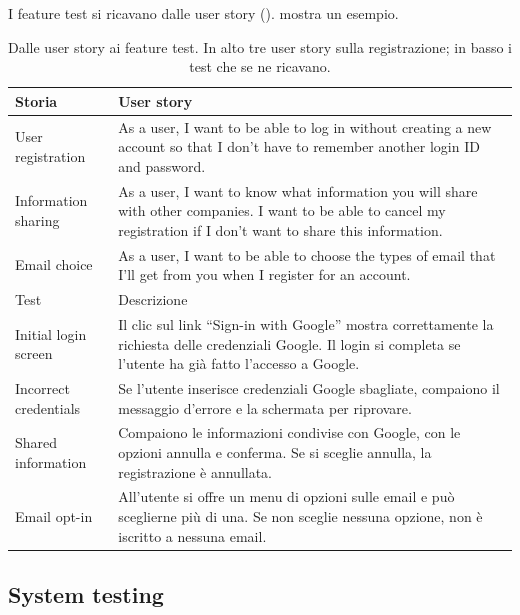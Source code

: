 I feature test si ricavano dalle user story ().  mostra un esempio.

\begin{table}[ht]
\centering
\small
\caption{Dalle user story ai feature test. In alto tre user story sulla registrazione; in basso i test che se ne
ricavano.}
\label{tab:test-storie}
\begin{tabularx}{\linewidth}{>{\raggedright\arraybackslash}p{3.2cm}X}
\toprule
Storia & User story \\
\midrule
User registration & As a user, I want to be able to log in without creating a new account so that I don't have to
  remember another login ID and password. \\
Information sharing & As a user, I want to know what information you will share with other companies. I want to be
  able to cancel my registration if I don't want to share this information. \\
Email choice & As a user, I want to be able to choose the types of email that I'll get from you when I register for
  an account. \\
\midrule
Test & Descrizione \\
\midrule
Initial login screen & Il clic sul link ``Sign-in with Google'' mostra correttamente la richiesta delle credenziali
  Google. Il login si completa se l'utente ha già fatto l'accesso a Google. \\
Incorrect credentials & Se l'utente inserisce credenziali Google sbagliate, compaiono il messaggio d'errore e la
  schermata per riprovare. \\
Shared information & Compaiono le informazioni condivise con Google, con le opzioni annulla e conferma. Se si sceglie
  annulla, la registrazione è annullata. \\
Email opt-in & All'utente si offre un menu di opzioni sulle email e può sceglierne più di una. Se non sceglie
  nessuna opzione, non è iscritto a nessuna email. \\
\bottomrule
\end{tabularx}
\end{table}

\subsection{System testing}
\label{sec:test-sistema}

